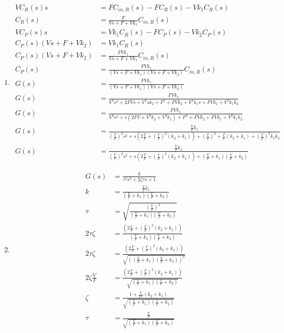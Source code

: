 \documentclass[12pt]{article}
\begin{document}
\begin{enumerate}
\begin{enumerate}
    
    \item
    \begin{align*}
        V C_R(s) s &= F C_{in,R}(s) - F C_R(s) - Vk_1C_R(s) \\
        C_R(s) &= \frac{F}{Vs + F + Vk_1} C_{in,R}(s) \\
        V C_P(s) s &= V k_1 C_R(s) - F C_P(s) - V k_2 C_P(s) \\
        C_P(s) (V s + F + V k_2) &= V k_1 C_R(s) \\
        C_P(s) (V s + F + V k_2) &= \frac{F V k_1}{Vs + F + Vk_1} C_{in,R}(s) \\
        C_P(s) &= \frac{F V k_1}{(Vs + F + Vk_1) (V s + F + V k_2)} C_{in,R}(s) \\
        G(s) &= \frac{F V k_1}{(Vs + F + Vk_1) (V s + F + V k_2)} \\
        G(s) &= \frac{F V k_1}{V^2s^2 + 2FVs + V^2sk_2 + F^2 + FVk_2 + V^2k_1s + FVk_1 + V^2k_1k_2} \\
        G(s) &= \frac{F V k_1}{V^2s^2 + s (2FV + V^2k_2 + V^2k_1) + F^2 + FVk_2 + FVk_1 + V^2k_1k_2} \\
        G(s) &= \frac{\frac{V}{F} k_1}{\left(\frac{V}{F}\right)^2 s^2 + s \left(2\frac{V}{F} + \left(\frac{V}{F}\right)^2 (k_2 + k_1)\right) + \left(\frac{V}{F}\right)^2 + \frac{F}{V} (k_2 + k_1) + \left(\frac{V}{F}\right)^2 k_1k_2} \\
        G(s) &= \frac{\frac{V}{F} k_1}{\left(\frac{V}{F}\right)^2 s^2 + s \left(2\frac{V}{F} + \left(\frac{V}{F}\right)^2 (k_2 + k_1)\right) + \left(\frac{V}{F} + k_1\right) \left(\frac{V}{F} + k_2\right)}
    \end{align*}

    \item
    \begin{align*}
        G(s) &= \frac{k}{\tau^2 s^2 + 2 \zeta \tau s + 1} \\
        k &= \frac{\frac{V}{F} k_1}{\left(\frac{V}{F} + k_1\right) \left(\frac{V}{F} + k_2\right)} \\
        \tau &= \sqrt{\frac{\left(\frac{V}{F}\right)^2}{\left(\frac{V}{F} + k_1\right) \left(\frac{V}{F} + k_2\right)}} \\
        2\tau\zeta &= \frac{\left(2\frac{V}{F} + \left(\frac{V}{F}\right)^2 (k_2 + k_1)\right)}{\left(\frac{V}{F} + k_1\right) \left(\frac{V}{F} + k_2\right)} \\
        2\tau\zeta &= \frac{\left(2\frac{V}{F} + \left(\frac{V}{F}\right)^2 (k_2 + k_1)\right)}{\sqrt{\left(\left(\frac{V}{F} + k_1\right) \left(\frac{V}{F} + k_2\right)\right)^2}} \\
        2\zeta \frac{V}{F} &= \frac{\left(2\frac{V}{F} + \left(\frac{V}{F}\right)^2 (k_2 + k_1)\right)}{\sqrt{\left(\frac{V}{F} + k_1\right) \left(\frac{V}{F} + k_2\right)}} \\
        \zeta &= \frac{1 + \frac{V}{2F} (k_2 + k_1)}{\sqrt{\left(\frac{V}{F} + k_1\right) \left(\frac{V}{F} + k_2\right)}} \\
        \tau &= \frac{\frac{V}{F}}{\sqrt{\left(\frac{V}{F} + k_1\right) \left(\frac{V}{F} + k_2\right)}}
    \end{align*}


\end{enumerate}
\end{enumerate}
\end{document}
